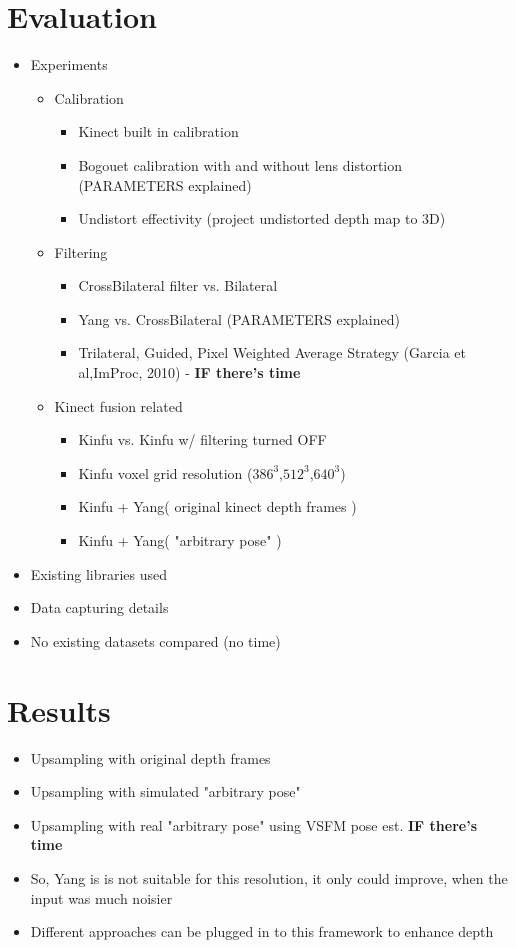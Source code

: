 \documentclass[12pt,a4paper]{article}
\begin{document}
\section{Evaluation}
	\begin{itemize}
 	\item Experiments
		\begin{itemize}
			\item Calibration
				\begin{itemize}
					\item Kinect built in calibration
					\item Bogouet calibration with and without lens distortion (PARAMETERS explained)
					\item Undistort effectivity (project undistorted depth map to 3D)
				\end{itemize}
				
			\item Filtering
				\begin{itemize}
					\item CrossBilateral filter vs. Bilateral
					\item Yang vs. CrossBilateral (PARAMETERS explained)
					\item Trilateral, Guided, Pixel Weighted Average Strategy (Garcia et al,ImProc, 2010) - {\bf IF there's time}
				\end{itemize}
			\item Kinect fusion related
			\begin{itemize}
				\item Kinfu vs. Kinfu w/ filtering turned OFF
				\item Kinfu voxel grid resolution ($386^3$,$512^3$,$640^3$)
				\item Kinfu + Yang( original kinect depth frames )
				\item Kinfu + Yang( "arbitrary pose" )
			\end{itemize}
		\end{itemize}
	\item Existing libraries used
	\item Data capturing details
	\item No existing datasets compared (no time)

	\end{itemize}

\section{Results}
\begin{itemize}
	\item Upsampling with original depth frames
	\item Upsampling with simulated "arbitrary pose"
	\item Upsampling with real "arbitrary pose" using VSFM pose est. {\bf IF there's time}
	
	\item So, Yang is is not suitable for this resolution, it only could improve, when the input was much noisier
	\item Different approaches can be plugged in to this framework to enhance depth
\end{itemize}
\end{document}

